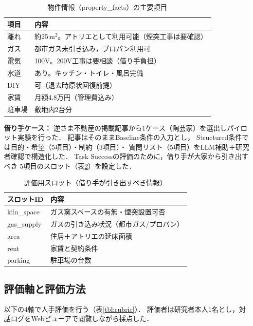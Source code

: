 \documentclass{FITpaper}
\begin{document}
\begin{table}[htbp]
  \centering
  \caption{物件情報（property\_facts）の主要項目}
  \label{tbl:property}
  \begin{tabular}{l|p{4.8cm}}
    項目 & 内容 \\
    \hline
    離れ & 約25\,m$^2$。アトリエとして利用可能（煙突工事は要確認） \\
    ガス & 都市ガス未引き込み，プロパン利用可 \\
    電気 & 100V。200V工事は要相談（借り手負担） \\
    水道 & あり。キッチン・トイレ・風呂完備 \\
    DIY & 可（退去時原状回復前提） \\
    家賃 & 月額4.8万円（管理費込み） \\
    駐車場 & 敷地内2台分 \\
  \end{tabular}
\end{table}

\textbf{借り手ケース：}
逆さま不動産の掲載記事から1ケース（陶芸家）を選出しパイロット実験を行った．
記事はそのままBaseline条件の入力とし，
Structured条件では目的・希望（5項目）・制約（3項目）・
質問リスト（5項目）をLLM補助＋研究者確認で構造化した．
Task Successの評価のために，借り手が大家から引き出すべき
5項目のスロット（表\ref{tbl:slots}）を設定した．

\begin{table}[htbp]
  \centering
  \caption{評価用スロット（借り手が引き出すべき情報）}
  \label{tbl:slots}
  \begin{tabular}{l|p{5cm}}
    スロットID & 内容 \\
    \hline
    kiln\_space & ガス窯スペースの有無・煙突設置可否 \\
    gas\_supply & ガスの引き込み状況（都市ガス/プロパン） \\
    area & 住居＋アトリエの延床面積 \\
    rent & 家賃と契約条件 \\
    parking & 駐車場の台数 \\
  \end{tabular}
\end{table}

\subsection{評価軸と評価方法}

以下の4軸で人手評価を行う（表\ref{tbl:rubric}）．
評価者は研究者本人1名とし，対話ログをWebビューアで閲覧しながら採点した．
\end{document}
